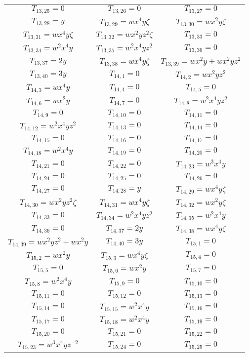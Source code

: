 \documentclass[12pt]{memoireuqam1.3}
\begin{document}
\begin{longtable}{|c|c|c|}
$T_{13,25}= 0$&
$T_{13,26}= 0$&
$T_{13,27}= 0$\\
$T_{13,28}= y$&
$T_{13,29}= wx^4y\zeta$&
$T_{13,30}= wx^2y\zeta$\\
$T_{13,31}= wx^4y\zeta$&
$T_{13,32}= wx^2yz^2\zeta$&
$T_{13,33}= 0$\\
$T_{13,34}= w^2x^4y$&
$T_{13,35}= w^2x^4yz^2$&
$T_{13,36}= 0$\\
$T_{13,37}= 2y$&
$T_{13,38}= wx^4y\zeta$&
$T_{13,39}= wx^2y+wx^2yz^2$\\
$T_{13,40}= 3y$&
$T_{14,1}= 0$&
$T_{14,2}= wx^2yz^2$\\
$T_{14,3}= wx^4y$&
$T_{14,4}= 0$&
$T_{14,5}= 0$\\
$T_{14,6}= wx^2y$&
$T_{14,7}= 0$&
$T_{14,8}= w^2x^4yz^2$\\
$T_{14,9}= 0$&
$T_{14,10}= 0$&
$T_{14,11}= 0$\\
$T_{14,12}= w^2x^4yz^2$&
$T_{14,13}= 0$&
$T_{14,14}= 0$\\
$T_{14,15}= 0$&
$T_{14,16}= 0$&
$T_{14,17}= 0$\\
$T_{14,18}= w^2x^4y$&
$T_{14,19}= 0$&
$T_{14,20}= 0$\\
$T_{14,21}= 0$&
$T_{14,22}= 0$&
$T_{14,23}= w^3x^4y$\\
$T_{14,24}= 0$&
$T_{14,25}= 0$&
$T_{14,26}= 0$\\
$T_{14,27}= 0$&
$T_{14,28}= y$&
$T_{14,29}= wx^4y\zeta$\\
$T_{14,30}= wx^2yz^2\zeta$&
$T_{14,31}= wx^4y\zeta$&
$T_{14,32}= wx^2y\zeta$\\
$T_{14,33}= 0$&
$T_{14,34}= w^2x^4yz^2$&
$T_{14,35}= w^2x^4y$\\
$T_{14,36}= 0$&
$T_{14,37}= 2y$&
$T_{14,38}= wx^4y\zeta$\\
$T_{14,39}= wx^2yz^2+wx^2y$&
$T_{14,40}= 3y$&
$T_{15,1}= 0$\\
$T_{15,2}= wx^2y$&
$T_{15,3}= wx^4y\zeta$&
$T_{15,4}= 0$\\
$T_{15,5}= 0$&
$T_{15,6}= wx^2y$&
$T_{15,7}= 0$\\
$T_{15,8}= w^2x^4y$&
$T_{15,9}= 0$&
$T_{15,10}= 0$\\
$T_{15,11}= 0$&
$T_{15,12}= 0$&
$T_{15,13}= 0$\\
$T_{15,14}= 0$&
$T_{15,15}= w^2x^4y$&
$T_{15,16}= 0$\\
$T_{15,17}= 0$&
$T_{15,18}= w^2x^4y$&
$T_{15,19}= 0$\\
$T_{15,20}= 0$&
$T_{15,21}= 0$&
$T_{15,22}= 0$\\
$T_{15,23}= w^3x^4yz^{-2}$&
$T_{15,24}= 0$&
$T_{15,25}= 0$\\

\end{longtable}
\end{document}
